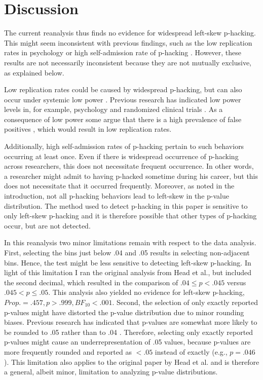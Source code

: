 \section*{Discussion} 
The current reanalysis thus finds no evidence for widespread left-skew p-hacking. This might seem inconsistent with previous findings, such as the low replication rates in psychology \cite{Baker_2015-qd} or high self-admission rate of p-hacking \cite{John2012-uj}. However, these results are not necessarily inconsistent because they are not mutually exclusive, as explained below. 

Low replication rates could be caused by widespread p-hacking, but can also occur under systemic low power \cite{Bakker2014-lr,Bakker_2012}. Previous research has indicated low power levels in, for example, psychology \cite{Cohen1962-jc,Sedlmeier1989-yc} and randomized clinical trials \cite{Moher1994-ra}. As a consequence of low power some argue that there is a high prevalence of false positives \cite{Ioannidis2005-am}, which would result in low replication rates.

Additionally, high self-admission rates of p-hacking \cite{John2012-uj} pertain to such behaviors occurring at least once. Even if there is widespread occurrence of p-hacking across researchers, this does not necessitate frequent occurrence. In other words, a researcher might admit to having p-hacked sometime during his career, but this does not necessitate that it occurred frequently. Moreover, as noted in the introduction, not all p-hacking behaviors lead to left-skew in the p-value distribution. The method used to detect p-hacking in this paper is sensitive to only left-skew p-hacking and it is therefore possible that other types of p-hacking occur, but are not detected.

In this reanalysis two minor limitations remain with respect to the data analysis. First, selecting the bins just below .04 and .05 results in selecting non-adjacent bins. Hence, the test might be less sensitive to detecting left-skew p-hacking. In light of this limitation I ran the original analysis from Head et al., but included the second decimal, which resulted in the comparison of $.04\leq p<.045$ versus $.045<p\leq.05$. This analysis also yielded no evidence for left-skew p-hacking, $Prop.=.457,p>.999,BF_{10}<.001$. Second, the selection of only exactly reported p-values might have distorted the p-value distribution due to minor rounding biases. Previous research has indicated that p-values are somewhat more likely to be rounded to .05 rather than to .04 \cite{Krawczyk2015-uh}. Therefore, selecting only exactly reported p-values might cause an underrepresentation of .05 values, because p-values are more frequently rounded and reported as $<.05$ instead of exactly (e.g., $p=.046$). This limitation also applies to the original paper by Head et al. and is therefore a general, albeit minor, limitation to analyzing p-value distributions.


